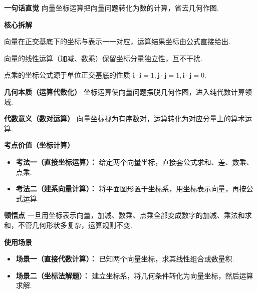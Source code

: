 \begin{explanationbox}
	\textbf{\textcolor{CExplanation}{一句话直觉}}
	向量坐标运算把向量问题转化为数的计算，省去几何作图.

	\medskip
	\textbf{\textcolor{CExplanation}{核心拆解}}
	\begin{description}[style=nextline, leftmargin=2.8em, labelsep=0.5em, itemsep=0.45em]
		\item[\textbf{要点一（坐标对应性）：}]
			向量在正交基底下的坐标与表示一一对应，运算结果坐标由公式直接给出.
		\item[\textbf{要点二（线性保持性）：}]
			向量的线性运算（加减、数乘）保留坐标分量独立性，互不干扰.
		\item[\textbf{要点三（点乘本质）：}]
			点乘的坐标公式源于单位正交基底的性质 $\mathbf{i}\cdot\mathbf{i}=1,\mathbf{j}\cdot\mathbf{j}=1,\mathbf{i}\cdot\mathbf{j}=0$.
	\end{description}

	\medskip
	\textbf{\textcolor{CExplanation}{几何本质（运算代数化）}}
	坐标运算使向量问题摆脱几何作图，进入纯代数计算领域.

	\medskip
	\textbf{\textcolor{CExplanation}{代数意义（数对运算）}}
	向量坐标视为有序数对，运算转化为对应分量上的算术运算.

	\medskip
	\textbf{\textcolor{CExplanation}{考点价值（坐标计算）}}
	\begin{itemize}[leftmargin=*, itemsep=0.5em, topsep=0.4em]
		\item \textbf{考法一（直接坐标运算）：} 给定两个向量坐标，直接套公式求和、差、数乘、点乘.
		\item \textbf{考法二（建系向量计算）：} 将平面图形置于坐标系，用坐标表示向量，再按公式运算.
	\end{itemize}

	\medskip
	\textbf{\textcolor{CExplanation}{顿悟点}}
	一旦用坐标表示向量，加减、数乘、点乘全部变成数字的加减、乘法和求和，不管几何形状多复杂，运算规则不变.

	\medskip
	\textbf{\textcolor{CExplanation}{使用场景}}
	\begin{itemize}[leftmargin=*, itemsep=0.5em, topsep=0.4em]
		\item \textbf{场景一（直接代数计算）：} 已知两个向量坐标，求其线性组合或数量积.
		\item \textbf{场景二（坐标法解题）：} 建立坐标系，将几何条件转化为向量坐标，然后运算求解.
	\end{itemize}

\end{explanationbox}
